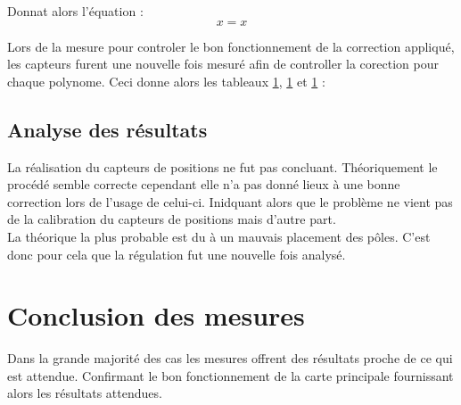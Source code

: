 Donnat alors l'équation :
\begin{equation}
    x = x
\end{equation}

Lors de la mesure pour controler le bon fonctionnement de la correction appliqué, les capteurs furent une nouvelle fois mesuré afin de controller la corection pour chaque polynome. Ceci donne alors les tableaux \ref{}, \ref{} et \ref{} :

\subsection{Analyse des résultats}
La réalisation du capteurs de positions ne fut pas concluant. Théoriquement le procédé semble correcte cependant elle n'a pas donné lieux à une bonne correction lors de l'usage de celui-ci. Inidquant alors que le problème ne vient pas de la calibration du capteurs de positions mais d'autre part.\\

La théorique la plus probable est du à un mauvais placement des pôles. C'est donc pour cela que la régulation fut une nouvelle fois analysé.

\section{Conclusion des mesures}
Dans la grande majorité des cas les mesures offrent des résultats proche de ce qui est attendue. Confirmant le bon fonctionnement de la carte principale fournissant alors les résultats attendues.